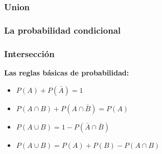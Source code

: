 \subsubsection{Union}


\subsubsection{La probabilidad condicional}


\subsubsection{Intersección}



\textbf{Las reglas básicas de probabilidad:}

\begin{itemize}
	\item $P(A) + P(\bar{A}) = 1$
	\item $P(A \cap B) + P(A \cap \bar{B}) = P(A)$
	\item $P(A \cup B) = 1 - P(\bar{A} \cap \bar{B})$
	\item $P(A \cup B) = P(A) + P(B) - P(A \cap B)$ 
\end{itemize} 







